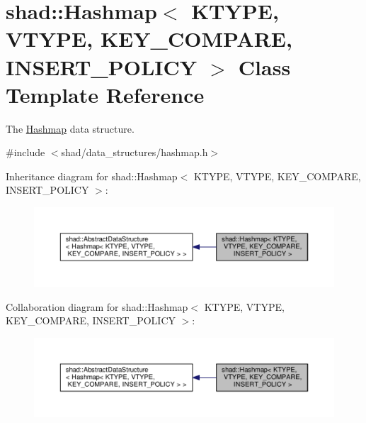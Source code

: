 \hypertarget{classshad_1_1Hashmap}{\section{shad\-:\-:Hashmap$<$ K\-T\-Y\-P\-E, V\-T\-Y\-P\-E, K\-E\-Y\-\_\-\-C\-O\-M\-P\-A\-R\-E, I\-N\-S\-E\-R\-T\-\_\-\-P\-O\-L\-I\-C\-Y $>$ Class Template Reference}
\label{classshad_1_1Hashmap}
}


The \hyperlink{classshad_1_1Hashmap}{Hashmap} data structure.  




{\ttfamily \#include $<$shad/data\-\_\-structures/hashmap.\-h$>$}



Inheritance diagram for shad\-:\-:Hashmap$<$ K\-T\-Y\-P\-E, V\-T\-Y\-P\-E, K\-E\-Y\-\_\-\-C\-O\-M\-P\-A\-R\-E, I\-N\-S\-E\-R\-T\-\_\-\-P\-O\-L\-I\-C\-Y $>$\-:
\nopagebreak
\begin{figure}[H]
\begin{center}
\leavevmode
\includegraphics[width=350pt]{classshad_1_1Hashmap__inherit__graph}
\end{center}
\end{figure}


Collaboration diagram for shad\-:\-:Hashmap$<$ K\-T\-Y\-P\-E, V\-T\-Y\-P\-E, K\-E\-Y\-\_\-\-C\-O\-M\-P\-A\-R\-E, I\-N\-S\-E\-R\-T\-\_\-\-P\-O\-L\-I\-C\-Y $>$\-:
\nopagebreak
\begin{figure}[H]
\begin{center}
\leavevmode
\includegraphics[width=350pt]{classshad_1_1Hashmap__coll__graph}
\end{center}
\end{figure}
